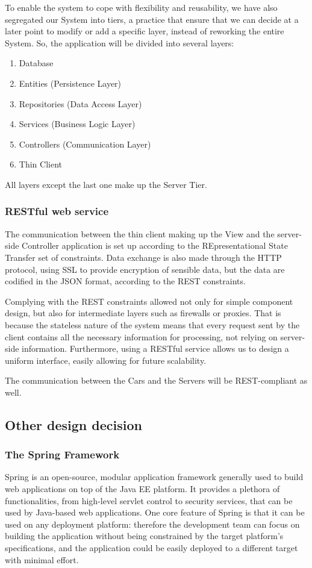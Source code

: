 \documentclass[12pt]{article}
\begin{document}
To enable the system to cope with flexibility and reusability, we have also segregated our System into tiers, a practice that ensure that we can decide at a later point to modify or add a specific layer, instead of reworking the entire System.
So, the application will be divided into several layers:
\begin{enumerate}
	\item Database
	\item Entities (Persistence Layer)
	\item Repositories (Data Access Layer)
	\item Services (Business Logic Layer)
	\item Controllers (Communication Layer)
	\item Thin Client
\end{enumerate}
All layers except the last one make up the Server Tier.

\subsubsection{RESTful web service}\label{sec:rest}
The communication between the thin client making up the View and the server-side Controller application is set up according to the REpresentational State Transfer set of constraints. Data exchange is also made through the HTTP protocol, using SSL to provide encryption of sensible data, but the data are codified in the JSON format, according to the REST constraints.

Complying with the REST constraints allowed not only for simple component design, but also for intermediate layers such as firewalls or proxies. That is because the stateless nature of the system means that every request sent by the client contains all the necessary information for processing, not relying on server-side information. Furthermore, using a RESTful service allows us to design a uniform interface, easily allowing for future scalability.

The communication between the Cars and the Servers will be REST-compliant as well.

\subsection{Other design decision}
\subsubsection{The Spring Framework} \label{Spring}
Spring is an open-source, modular application framework generally used to build web applications on top of the Java EE platform. It provides a plethora of functionalities, from high-level servlet control to security services, that can be used by Java-based web applications. One core feature of Spring is that it can be used on any deployment platform: therefore the development team can focus on building the application without being constrained by the target platform's specifications, and the application could be easily deployed to a different target with minimal effort.
\end{document}
